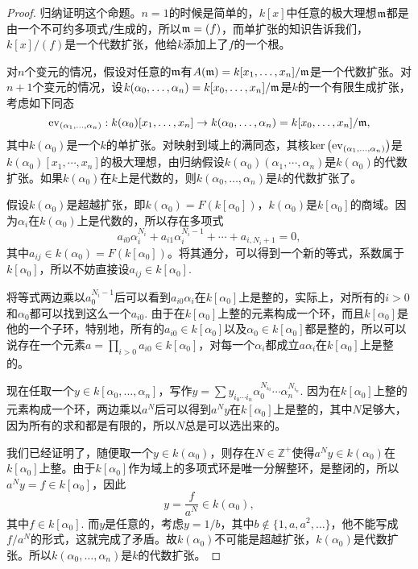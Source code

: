 \begin{proof} 
	归纳证明这个命题。$n=1$的时候是简单的，$k[x]$中任意的极大理想$\mathfrak{m}$都是由一个不可约多项式$f$生成的，所以$\mathfrak{m}=(f)$，而单扩张的知识告诉我们，$k[x]/(f)$是一个代数扩张，他给$k$添加上了$f$的一个根。

	对$n$个变元的情况，假设对任意的$\mathfrak{m}$有$A(\mathfrak{m})=k[x_1,\dots,x_n]/\mathfrak{m}$是一个代数扩张。对$n+1$个变元的情况，设$k(\alpha_0,\dots,\alpha_{n})=k[x_0,\dots,x_n]/\mathfrak{m}$是$k$的一个有限生成扩张，考虑如下同态
	\[
		\operatorname{ev}_{(\alpha_1,\dots,\alpha_n)}:k(\alpha_0)[x_1,\dots,x_{n}]\to k(\alpha_0,\dots,\alpha_{n})=k[x_0,\dots,x_n]/\mathfrak{m},
	\]
	其中$k(\alpha_0)$是一个$k$的单扩张。对映射到域上的满同态，其核$\ker\left(\operatorname{ev}_{(\alpha_1,\dots,\alpha_n)}\right)$是$k(\alpha_0)[x_1,\cdots,x_{n}]$的极大理想，由归纳假设$k(\alpha_0)(\alpha_1,\cdots,\alpha_{n})$是$k(\alpha_0)$的代数扩张。如果$k(\alpha_0)$在$k$上是代数的，则$k(\alpha_0,\dots,\alpha_{n})$是$k$的代数扩张了。

	假设$k(\alpha_0)$是超越扩张，即$k(\alpha_0)=F(k[\alpha_0])$，$k(\alpha_0)$是$k[\alpha_0]$的商域。因为$\alpha_i$在$k(\alpha_0)$上是代数的，所以存在多项式
	\[
		a_{i0}\alpha_i^{N_i}+a_{i1}\alpha_i^{N_i-1}+\cdots +a_{i,N_i+1}=0,
	\]
	其中$a_{ij}\in k(\alpha_0)=F(k[\alpha_0])$。将其通分，可以得到一个新的等式，系数属于$k[\alpha_0]$，所以不妨直接设$a_{ij}\in k[\alpha_0]$.

	将等式两边乘以$a_0^{N_i-1}$后可以看到$a_{i0}\alpha_i$在$k[\alpha_0]$上是整的，实际上，对所有的$i>0$和$\alpha_0$都可以找到这么一个$a_{i0}$. 由于在$k[\alpha_0]$上整的元素构成一个环，而且$k[\alpha_0]$是他的一个子环，特别地，所有的$a_{i0}\in k[\alpha_0]$以及$\alpha_0\in k[\alpha_0]$都是整的，所以可以说存在一个元素$a=\prod_{i>0}a_{i0}\in k[\alpha_0]$，对每一个$\alpha_i$都成立$a\alpha_i$在$k[\alpha_0]$上是整的。

	现在任取一个$y\in k[\alpha_0,\dots,\alpha_n]$，写作$y=\sum y_{i_0 \cdots i_n}\alpha_0^{N_{i_0}}\cdots\alpha_{n}^{N_{i_n}}$.
	因为在$k[\alpha_0]$上整的元素构成一个环，两边乘以$a^N$后可以得到$a^Ny$在$k[\alpha_0]$上是整的，其中$N$足够大，因为所有的求和都是有限的，所以$N$总是可以选出来的。

	我们已经证明了，随便取一个$y\in k(\alpha_0)$，则存在$N\in \mathbb{Z}^+$使得$a^Ny\in k(\alpha_0)$在$k[\alpha_0]$上整。由于$k[\alpha_0]$作为域上的多项式环是唯一分解整环，是整闭的，所以$a^Ny=f\in k[\alpha_0]$，因此
	\[
		y=\frac{f}{a^N}\in k(\alpha_0),
	\]
	其中$f\in k[\alpha_0]$. 而$y$是任意的，考虑$y=1/b$，其中$b\not\in \{1,a,a^2,\dots\}$，他不能写成$f/a^N$的形式，这就完成了矛盾。故$k(\alpha_0)$不可能是超越扩张，$k(\alpha_0)$是代数扩张。所以$k(\alpha_0,\dots,\alpha_{n})$是$k$的代数扩张。
\end{proof}


